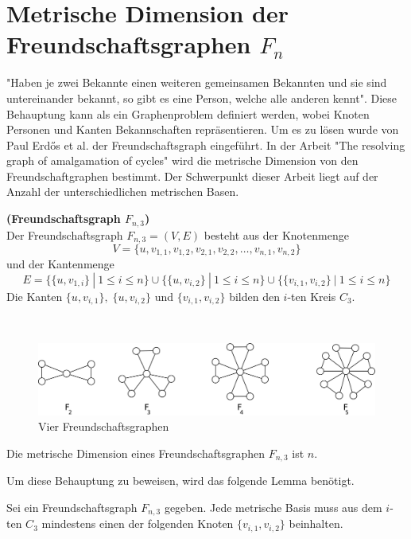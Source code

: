 \section{Metrische Dimension der Freundschaftsgraphen $F_{n}$}
\vspace{-3mm}
"Haben je zwei Bekannte einen weiteren gemeinsamen Bekannten und sie sind untereinander bekannt, so gibt es eine Person, welche alle anderen kennt". Diese Behauptung kann als ein Graphenproblem definiert werden, wobei Knoten Personen und Kanten Bekannschaften repräsentieren. Um es zu lösen wurde von Paul Erdős et al. \cite{Erdos} der Freundschaftsgraph eingeführt. In der Arbeit "The resolving graph of amalgamation of cycles"\cite{amal} wird die metrische Dimension von den Freundschaftgraphen bestimmt. Der Schwerpunkt dieser Arbeit liegt auf der Anzahl der unterschiedlichen metrischen Basen.
\begin{defi}{\textbf{(Freundschaftsgraph $F_{n,3}$)}}\\
Der Freundschaftsgraph $F_{n,3}=(V,E)$ besteht aus der Knotenmenge $$V = \{u,v_{1,1},v_{1,2},v_{2,1},v_{2,2},\ldots,v_{n,1},v_{n,2}\}$$ und der Kantenmenge $$E = \{ \{u,v_{1,i}\}~|~ 1 \leq i \leq n \} \cup \{ \{u,v_{i,2}\}~|~ 1 \leq i \leq n \} \cup \{ \{ v_{i,1}, v_{i,2} \} ~|~ 1 \leq i \leq n \}$$
Die Kanten $\{u,v_{i,1}\},\;\{u,v_{i,2}\}$ und $\{v_{i,1},v_{i,2}\}$ bilden den $i$-ten Kreis $C_3$.
\end{defi}
\begin{bsp}~
\vspace{-4mm}
\begin{figure}[h!]
\centering
 		 \includegraphics[width=360pt]{bilder/freunschaftsgraph.pdf}
   \caption{Vier Freundschaftsgraphen}
   \label{bild:fg}
\end{figure}
\vspace{-3mm}
\end{bsp}
\begin{lem}
\label{Freundschaftsgraphen}
Die metrische Dimension eines Freundschaftsgraphen $F_{n,3}$ ist $n$.
\end{lem}
\vspace{-2mm}
Um diese Behauptung zu beweisen, wird das folgende Lemma benötigt. 
\begin{lem}
\label{mindfreundschaftsgraph}
Sei ein Freundschaftsgraph $F_{n,3}$ gegeben. Jede metrische Basis muss aus dem $i$-ten $C_3$ mindestens einen der folgenden Knoten $\{v_{i,1},v_{i,2}\}$ beinhalten. 
\end{lem}
